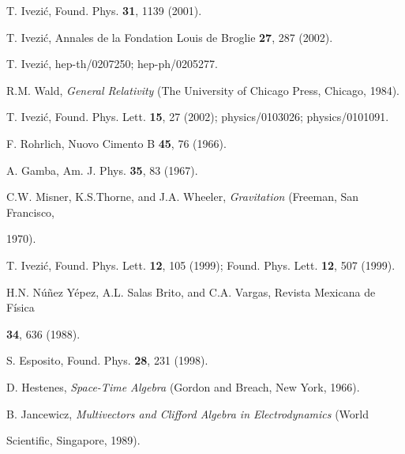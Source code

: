 \documentclass[a4paper,showpacs,preprintnumbers,amsmath,amssymb]{revtex4}
\begin{document}
\noindent \myHighlight{$\left[ 4\right] $}\coordHE{} T. Ivezi\'{c}, Found. Phys. \textbf{31}, 1139
(2001).

\noindent \myHighlight{$\left[ 5\right] $}\coordHE{} T. Ivezi\'{c}, Annales de la Fondation Louis de
Broglie \textbf{27}, 287 (2002).

\noindent \myHighlight{$\left[ 6\right] $}\coordHE{} T. Ivezi\'{c}, hep-th/0207250; hep-ph/0205277.

\noindent \myHighlight{$\left[ 7\right] $}\coordHE{} R.M. Wald, \textit{General Relativity} (The
University of Chicago Press, Chicago, 1984).

\noindent \myHighlight{$\left[ 8\right] $}\coordHE{} T. Ivezi\'{c}, Found. Phys. Lett. \textbf{15},
27 (2002); physics/0103026; physics/0101091.

\noindent \myHighlight{$\left[ 9\right] $}\coordHE{} F. Rohrlich, Nuovo Cimento B \textbf{45}, 76
(1966).

\noindent \myHighlight{$\left[ 10\right] $}\coordHE{} A. Gamba, Am. J. Phys. \textbf{35}, 83 (1967).

\noindent \myHighlight{$\left[ 11\right] $}\coordHE{} C.W. Misner, K.S.Thorne, and J.A. Wheeler,
\textit{Gravitation} (Freeman, San Francisco,

1970).

\noindent \myHighlight{$\left[ 12\right] $}\coordHE{} T. Ivezi\'{c}, Found. Phys. Lett. \textbf{12},
105 (1999); Found. Phys. Lett. \textbf{12}, 507 (1999).

\noindent \myHighlight{$\left[ 13\right] $}\coordHE{} H.N. N\'{u}\~{n}ez Y\'{e}pez, A.L. Salas
Brito, and C.A. Vargas, Revista Mexicana de F\'{i}sica

\textbf{34}, 636 (1988).

\noindent \myHighlight{$\left[ 14\right] $}\coordHE{} S. Esposito, Found. Phys. \textbf{28}, 231
(1998).

\noindent \myHighlight{$\left[ 15\right] $}\coordHE{} D. Hestenes, \textit{Space-Time Algebra }%
(Gordon and Breach, New York, 1966).

\noindent \myHighlight{$\left[ 16\right] $}\coordHE{} B. Jancewicz, \textit{Multivectors and
Clifford Algebra in Electrodynamics} (World

Scientific, Singapore, 1989).
\end{document}
